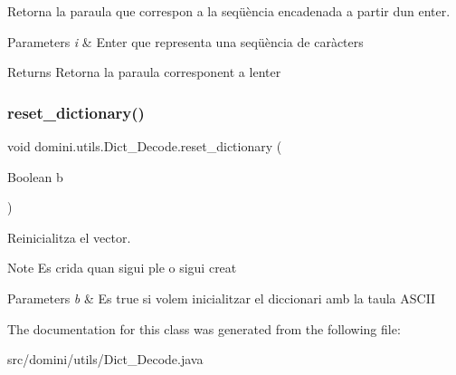 Retorna la paraula que correspon a la seqüència encadenada a partir d\textquotesingle{}un enter. 


\begin{DoxyParams}{Parameters}
{\em i} & Enter que representa una seqüència de caràcters \\
\hline
\end{DoxyParams}
\begin{DoxyReturn}{Returns}
Retorna la paraula corresponent a l\textquotesingle{}enter 
\end{DoxyReturn}
\mbox{\label{classdomini_1_1utils_1_1Dict__Decode_a635432505df1ceaa58a987bb80c6b0a3}} 
\subsubsection{\texorpdfstring{reset\+\_\+dictionary()}{reset\_dictionary()}}
{\footnotesize\ttfamily void domini.\+utils.\+Dict\+\_\+\+Decode.\+reset\+\_\+dictionary (\begin{DoxyParamCaption}\item[{Boolean}]{b }\end{DoxyParamCaption})\hspace{0.3cm}{\ttfamily [inline]}}



Reinicialitza el vector. 

\begin{DoxyNote}{Note}
Es crida quan sigui ple o sigui creat 
\end{DoxyNote}

\begin{DoxyParams}{Parameters}
{\em b} & Es true si volem inicialitzar el diccionari amb la taula A\+S\+C\+II \\
\hline
\end{DoxyParams}


The documentation for this class was generated from the following file\+:\begin{DoxyCompactItemize}
\item 
src/domini/utils/Dict\+\_\+\+Decode.\+java\end{DoxyCompactItemize}

